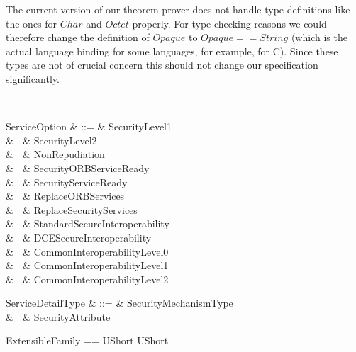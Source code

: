 The current version of our theorem prover does not handle type definitions like
the ones for $Char$ and $Octet$ properly.  For type checking reasons we could
therefore change the definition of $Opaque$ to $Opaque == String$ (which is the
actual language binding for some languages, for example, for C).  Since these
types are not of crucial concern this should not change our specification
significantly.     
  
\begin{zed}
  [ Any ] \\  
\end{zed}
\begin{syntax}
   ServiceOption & ::= & SecurityLevel1\\
  & | & SecurityLevel2\\
  & | & NonRepudiation\\
  & | & SecurityORBServiceReady\\
  & | & SecurityServiceReady\\
  & | & ReplaceORBServices\\
  & | & ReplaceSecurityServices\\
  & | & StandardSecureInteroperability\\
  & | & DCESecureInteroperability\\
  & | & CommonInteroperabilityLevel0\\
  & | & CommonInteroperabilityLevel1\\
  & | & CommonInteroperabilityLevel2\\
\end{syntax}
\begin{syntax}
   ServiceDetailType & ::= & SecurityMechanismType\\
  & | & SecurityAttribute\\
\end{syntax}
\begin{zed}
  ExtensibleFamily == UShort \cross UShort
\end{zed}
